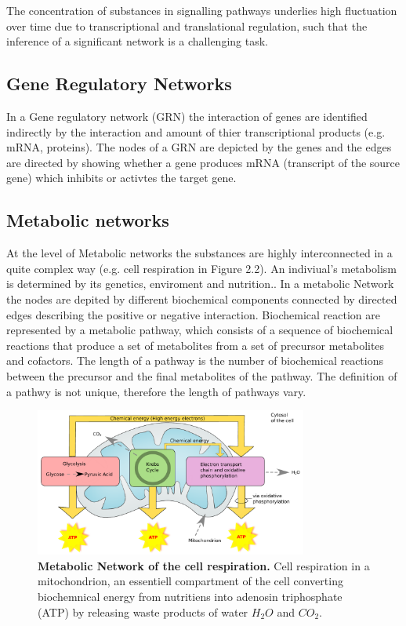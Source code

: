 The concentration of substances in signalling pathways underlies high fluctuation over time due to transcriptional and translational regulation, such that the inference of a significant network is a challenging task.\citep{BIES:BIES20834} 
\citep{steadystate}

\subsection*{Gene Regulatory Networks}

In a Gene regulatory network (\gls{GRN}) the interaction of genes are identified indirectly by the interaction and amount of thier transcriptional products (e.g. mRNA, proteins). %
The nodes of a GRN are depicted by the genes and the edges are directed by showing whether a gene produces mRNA (transcript of the source gene) which inhibits or activtes the target gene. %


\subsection*{Metabolic networks}

At the level of Metabolic networks the substances are highly interconnected in a quite complex way (e.g. cell respiration in Figure 2.2). An indiviual's metabolism is determined by its genetics, enviroment and nutrition.\citep{8}. In a metabolic Network the nodes are depited by different biochemical components connected by directed edges describing the positive or negative interaction. Biochemical reaction are represented by a metabolic pathway, which consists of a sequence of biochemical reactions that produce a set of metabolites from a set of precursor metabolites and cofactors. The length of a pathway is the number of biochemical reactions between the precursor and the final metabolites of the pathway. The definition of a pathwy is not unique, therefore the length of pathways vary. \citep{9}

\begin{figure}[H]
\centering
\captionsetup{width=.8\linewidth}
\includegraphics[width=0.8\textwidth]{./Bilder/metabolic.pdf}
\caption[Metabolic Network]{\textbf{Metabolic Network of the cell respiration. } Cell respiration in a mitochondrion, an essentiell compartment of the cell converting biochemnical energy from nutritiens into adenosin triphosphate (\gls{ATP}) by releasing waste products of water $H_{2}O$ and $CO_{2}$.}
\label{fig:Fig.3.}
\end{figure} 

